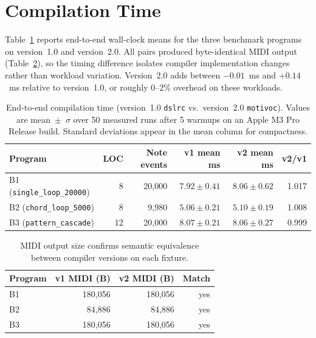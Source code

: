 \section{Compilation Time}\label{sec:compile-time}

Table~\ref{tab:benchmark-wall-clock} reports end-to-end wall-clock means for the three benchmark programs on version~1.0
and version~2.0.
All pairs produced byte-identical MIDI output (Table~\ref{tab:benchmark-midi-size}), so the timing difference isolates
compiler implementation changes rather than workload variation.
Version~2.0 adds between $-0.01$~ms and $+0.14$~ms relative to version~1.0, or roughly $0$--$2\%$ overhead on these
workloads.

\begin{table}[htbp]
  \centering
  \footnotesize
  \renewcommand{\arraystretch}{1.25}
  \begin{tabular}{lrrrrr}
    \toprule
    \textbf{Program} & \textbf{LOC} & \textbf{Note events} & \textbf{v1 mean ms} & \textbf{v2 mean ms} &
    \textbf{v2/v1} \\
    \midrule
    B1 (\texttt{single\_loop\_20000}) & 8 & 20,000 & $7.92 \pm 0.41$ & $8.06 \pm 0.62$ & 1.017 \\
    B2 (\texttt{chord\_loop\_5000}) & 8 & 9,980 & $5.06 \pm 0.21$ & $5.10 \pm 0.19$ & 1.008 \\
    B3 (\texttt{pattern\_cascade}) & 12 & 20,000 & $8.07 \pm 0.21$ & $8.06 \pm 0.27$ & 0.999 \\
    \bottomrule
  \end{tabular}
  \caption{End-to-end compilation time (version~1.0 \texttt{dslrc} vs.\ version~2.0 \texttt{motivoc}).
    Values are mean~$\pm$~$\sigma$ over 50 measured runs after 5 warmups on an Apple M3 Pro Release build.
  Standard deviations appear in the mean column for compactness.}\label{tab:benchmark-wall-clock}
\end{table}

\begin{table}[htbp]
  \centering
  \footnotesize
  \renewcommand{\arraystretch}{1.25}
  \begin{tabular}{lrrr}
    \toprule
    \textbf{Program} & \textbf{v1 MIDI (B)} & \textbf{v2 MIDI (B)} & \textbf{Match} \\
    \midrule
    B1 & 180,056 & 180,056 & yes \\
    B2 & 84,886 & 84,886 & yes \\
    B3 & 180,056 & 180,056 & yes \\
    \bottomrule
  \end{tabular}
  \caption{MIDI output size confirms semantic equivalence between compiler versions on each fixture.}%
  \label{tab:benchmark-midi-size}
\end{table}

